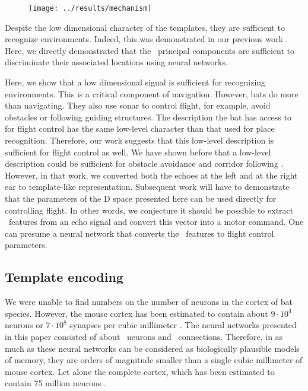 \documentclass[preprint,5p]{elsarticle}
\begin{document}
\begin{figure}[tb]
	\centering
	\texttt{[image: ../results/mechanism]}
	\caption{}
	\label{fig:mechanism}
\end{figure}

Despite the low dimensional character of the templates, they are sufficient to recognize environments. Indeed, this was demonstrated in our previous work \citep{Vanderelst2016}. Here, we directly demonstrated that the  \pca\ principal components are sufficient to discriminate their associated locations using neural networks.

Here, we show that a low dimensional signal is sufficient for recognizing environments. This is a critical component of navigation. However, bats do more than navigating. They also use sonar to control flight, for example, avoid obstacles or following guiding structures. The description the bat has access to for flight control has the same low-level character than that used for place recognition. Therefore, our work suggests that this low-level description is sufficient for flight control as well. We have shown before that a low-level description could be sufficient for obstacle avoidance and corridor following \citep{Vanderelst2015a,Mansour2019}. However, in that work, we converted both the echoes at the left and at the right ear to template-like representation. Subsequent work will have to demonstrate that the parameters of the \pca D space presented here can be used directly for controlling flight. In other words, we conjecture it should be possible to extract \pca\ features from an echo signal and convert this vector into a motor command. One can presume a neural network that converts the \pca\ features to flight control parameters.

\subsection{Template encoding}

We were unable to find numbers on the number of neurons in the cortex of bat species. However, the mouse cortex has been estimated to contain about $9 \cdot 10^4$ neurons or $7 \cdot 10^8$ synapses per cubic millimeter \citep{Braitenberg2013}. The neural networks presented in this paper consisted of about \nneurons\ neurons and \nweights\ connections. Therefore, in as much as these neural networks can be considered as biologically plausible models of memory, they are orders of magnitude smaller than a single cubic millimeter of mouse cortex. Let alone the complete cortex, which has been estimated to contain 75 million neurons \citep{Williams2000}. 
\end{document}
